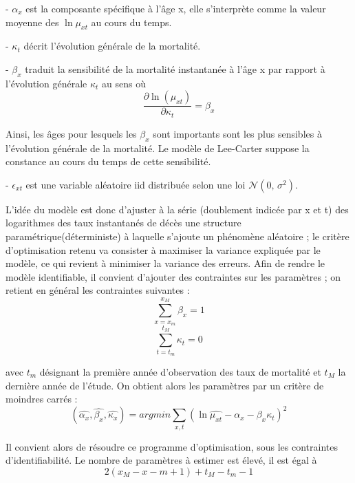 - \textbf{$\alpha_x$} est la composante spécifique à l’âge x, elle s’interprète comme la valeur
moyenne des \textbf{$\ln \mu_{xt}$} au cours du temps.

- \textbf{$\kappa_t$} décrit l’évolution générale de la mortalité.

- \textbf{$\beta_x$} traduit la sensibilité de la mortalité instantanée à l’âge x par rapport à l’évolution générale \textbf{$\kappa_t$} au sens où \begin{equation}\frac{\partial \ln(\mu_{xt})}{\partial \kappa_t} = \beta_x
\end{equation}

Ainsi, les âges pour lesquels les \textbf{$\beta_x$} sont importants sont les plus sensibles à l’évolution générale de la mortalité. Le modèle de Lee-Carter suppose la constance au cours du temps de cette sensibilité.

- \textbf{$\epsilon_{xt}$} est une variable aléatoire iid distribuée selon une loi $\mathcal{N}(0,\,\sigma^{2})$. 

L’idée du modèle est donc d’ajuster à la série (doublement indicée par x et t) des logarithmes des taux instantanés de décès une structure paramétrique(déterministe) à laquelle s’ajoute un phénomène aléatoire ; le critère d’optimisation retenu va consister à maximiser la variance expliquée par le modèle, ce qui revient à minimiser la variance des erreurs.
Afin de rendre le modèle identifiable, il convient d’ajouter des contraintes sur les paramètres ; on retient en général les contraintes suivantes :
\begin{equation}
\sum_{x=x_m}^{x_M} \beta_x = 1
\end{equation}
\begin{equation}
\sum_{t=t_m}^{t_M} \kappa_t = 0
\end{equation}

avec $t_m$ désignant la première année d’observation des taux de mortalité et $t_M$ la
dernière année de l’étude.
On obtient alors les paramètres par un critère de moindres carrés :  \begin{equation}
(\hat{\alpha_x},\hat{\beta_x},\hat{\kappa_x}) = arg min \sum_{x,t} (\ln \hat{\mu_{xt}}-\alpha_x - \beta_x \kappa_t)^2
\end{equation}

Il convient alors de résoudre ce programme d’optimisation, sous les contraintes d’identifiabilité. Le nombre de paramètres à estimer est élevé, il est égal à
\begin{equation} 
2(x_M - x-m + 1) + t_M - t_m -1
\end{equation}

